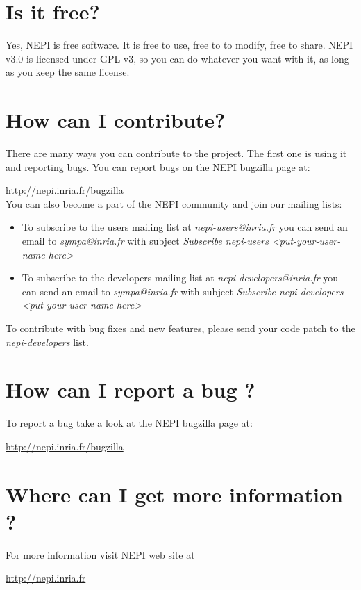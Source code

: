 \section{Is it free?}

Yes, NEPI is free software. It is free to use, free to to modify, free to share.
NEPI v3.0 is licensed under GPL v3, so you can do whatever you want with it, 
as long as you keep the same license. 

\section{How can I contribute?}

There are many ways you can contribute to the project. 
The first one is using it and reporting bugs. 
You can report bugs on the NEPI bugzilla page at: 

\url{http://nepi.inria.fr/bugzilla} \\

You can also become a part of the NEPI community and join our mailing lists:

\begin{itemize}
    \item To subscribe to the users mailing list at \textit{nepi-users@inria.fr}
        you can send an email to \textit{sympa@inria.fr} with subject
        \textit{Subscribe nepi-users <put-your-user-name-here>}
    \item To subscribe to the developers mailing list at \textit{nepi-developers@inria.fr}
        you can send an email to \textit{sympa@inria.fr} with subject
        \textit{Subscribe nepi-developers <put-your-user-name-here>}
    \end{itemize}

To contribute with bug fixes and new features, please send your code patch
to the \textit{nepi-developers} list.

\section{How can I report a bug ?}

To report a bug take a look at the NEPI bugzilla page at:

\url{http://nepi.inria.fr/bugzilla} \\

\section{Where can I get more information ?}

For more information visit NEPI web site at

\url{http://nepi.inria.fr} \\


